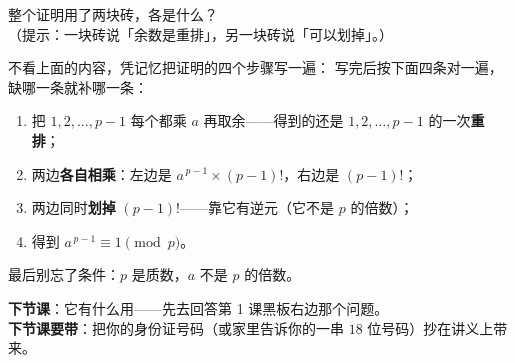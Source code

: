 \begin{sikao}
  整个证明用了两块砖，各是什么？\\
  （提示：一块砖说「余数是重排」，另一块砖说「可以划掉」。）
\end{sikao}

\begin{xiaojie}
  不看上面的内容，凭记忆把证明的四个步骤写一遍：
  写完后按下面四条对一遍，缺哪一条就补哪一条：
  \begin{enumerate}
    \item 把 \(1,2,\dots,p-1\) 每个都乘 \(a\) 再取余——得到的还是 \(1,2,\dots,p-1\) 的一次\textbf{重排}；
    \item 两边\textbf{各自相乘}：左边是 \(a^{\,p-1}\times(p-1)!\)，右边是 \((p-1)!\)；
    \item 两边同时\textbf{划掉} \((p-1)!\)——靠它有逆元（它不是 \(p\) 的倍数）；
    \item 得到 \(a^{\,p-1}\equiv1\pmod p\)。
  \end{enumerate}
  最后别忘了条件：\(p\) 是质数，\(a\) 不是 \(p\) 的倍数。
\end{xiaojie}

\noindent\textbf{下节课}：它有什么用——先去回答第 1 课黑板右边那个问题。\\
\textbf{下节课要带}：把你的身份证号码（或家里告诉你的一串 \(18\) 位号码）抄在讲义上带来。
